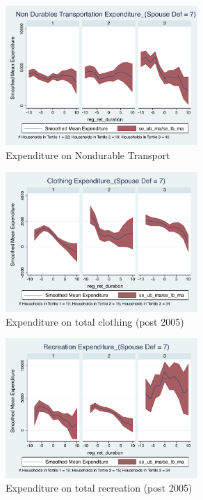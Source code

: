 \documentclass[11pt,onecolumn]{article}
\numberwithin{figure}{section}
\begin{document}
\begin{figure}[h]
	\caption{Expenditure on Nondurable Transport}
	\centering
	\includegraphics[width=0.65\textwidth]{../ConsumptionPostRetirement_by_SpouseDef_Cats/Smoothed/7/spouse_def_total_transport_real.pdf}
\end{figure}
\clearpage

\begin{figure}[h]
	\caption{Expenditure on total clothing (post 2005)}
	\centering
	\includegraphics[width=0.65\textwidth]{../ConsumptionPostRetirement_by_SpouseDef_Cats/Smoothed/7/spouse_def_total_clothing_2005_real.pdf}
\end{figure}

\begin{figure}[h]
	\caption{Expenditure on total recreation (post 2005)}
	\centering
	\includegraphics[width=0.65\textwidth]{../ConsumptionPostRetirement_by_SpouseDef_Cats/Smoothed/7/spouse_def_total_recreation_2005_real.pdf}
\end{figure}
\end{document}
